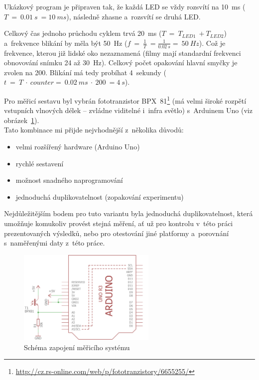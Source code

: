 Ukázkový program je připraven tak, že každá LED se vždy rozsvítí na 10~ms ($T~=~0.01~s~= 10~ms$), následně zhasne a~rozsvítí se druhá LED. 

Celkový čas jednoho průchodu cyklem trvá 20~ms ($T~=~T_{LED1}~+ T_{LED2}$) a~frekvence blikání by měla být 50~Hz ($f~=~\frac{1}{T}~= \frac{1}{0.02~s} =~50~Hz$). 
Což je frekvence, kterou již lidské oko nezaznamená (filmy mají standardní frekvenci obnovování snímku 24 až 30~Hz). %
Celkový počet opakování hlavní smyčky je zvolen na 200. 
Blikání má tedy probíhat 4~sekundy ($t~=~T~\cdot~counter =~0.02~ms~\cdot~200~= 4~s$).

Pro měřicí sestavu byl vybrán fototranzistor BPX~81\footnote{\url{http://cz.rs-online.com/web/p/fototranzistory/6655255/}} (má velmi široké rozpětí vstupních vlnových délek -- zvládne viditelné i~infra světlo) s~Arduinem Uno (viz obrázek~\ref{fig:arduino-measuring-system}). \\

Tato kombinace mi přijde nejvhodnější z~několika důvodů: 

\begin{itemize}
	\item velmi rozšířený hardware (Arduino Uno)
	\item rychlé sestavení
	\item možnost snadného naprogramování
	\item jednoduchá duplikovatelnost (zopakování experimentu)
\end{itemize}  

Nejdůležitějším bodem pro tuto variantu byla jednoduchá duplikovatelnost, která umožňuje komukoliv provést stejná měření, ať už pro kontrolu v~této práci prezentovaných výsledků, nebo pro otestování jiné platformy a~porovnání s~naměřenými daty z~této práce.

\begin{figure}[h]
	\centering
	\includegraphics[width=250px]{images/measuring-arduino-system_schema.png}	
	\caption[Schéma zapojení měřicího systému]{Schéma zapojení měřicího systému}
	\label{fig:arduino-measuring-system}
\end{figure}

